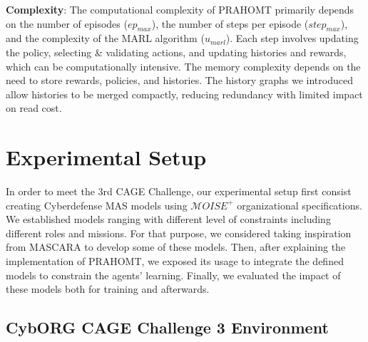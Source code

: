 \documentclass[conference]{IEEEtran}
\begin{document}
\textbf{Complexity}: \quad The computational complexity of PRAHOMT primarily depends on the number of episodes ($ep_{max}$), the number of steps per episode ($step_{max}$), and the complexity of the MARL algorithm ($u_{marl}$). Each step involves updating the policy, selecting \& validating actions, and updating histories and rewards, which can be computationally intensive. The memory complexity depends on the need to store rewards, policies, and histories. The history graphs we introduced allow histories to be merged compactly, reducing redundancy with limited impact on read cost.




\section{Experimental Setup}\label{sec:experimental_setup}

In order to meet the 3rd CAGE Challenge, our experimental setup first consist creating Cyberdefense MAS models using $\mathcal{M}OISE^+$ organizational specifications. We established models ranging with different level of constraints including different roles and missions. For that purpose, we considered taking inspiration from MASCARA to develop some of these models. Then, after explaining the implementation of PRAHOMT, we exposed its usage to integrate the defined models to constrain the agents' learning. Finally, we evaluated the impact of these models both for training and afterwards.


\subsection{CybORG CAGE Challenge 3 Environment}
\end{document}

